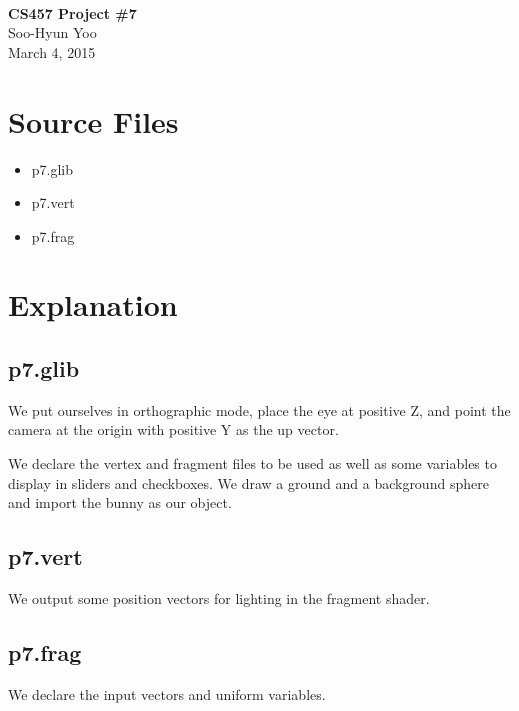 \documentclass[12pt,letterpaper]{article}
\begin{document}
\fancyfoot{}
\begin{center}
    \hfill \\
    \vspace{4in}
    {\bf\Huge CS457 Project \#7 \\}
    \vspace{2in}
    {\Large Soo-Hyun Yoo \\ March 4, 2015}
\end{center}

\newpage
{}

\section*{Source Files}

\begin{itemize}
    \item p7.glib
    \item p7.vert
    \item p7.frag
\end{itemize}


\section*{Explanation}

\subsection*{p7.glib}

We put ourselves in orthographic mode, place the eye at positive Z, and point
the camera at the origin with positive Y as the up vector.

We declare the vertex and fragment files to be used as well as some variables
to display in sliders and checkboxes. We draw a ground and a background sphere
and import the bunny as our object.

\subsection*{p7.vert}

We output some position vectors for lighting in the fragment shader.

\subsection*{p7.frag}

We declare the input vectors and uniform variables.
\end{document}
